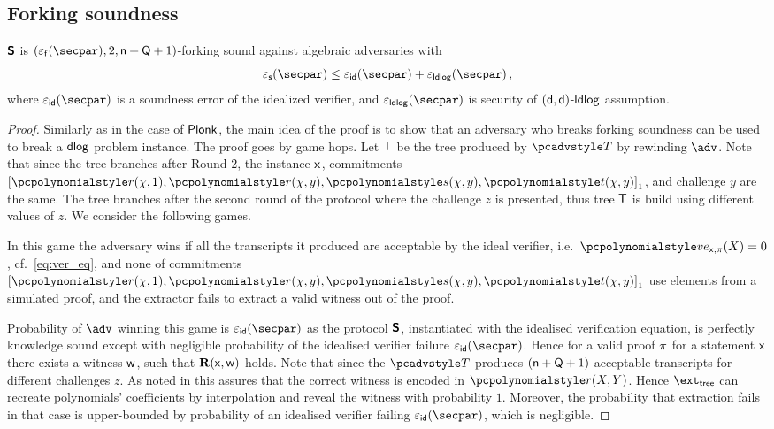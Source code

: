 \documentclass[runningheads,11pt]{llncs}
\begin{document}
\subsection{Forking soundness}
\begin{lemma}
	\label{lem:sonicprot_ss}
  $\bm{\mathsf{S}}$ is $(\epsss(\secpar), 2, \multconstr + \linconstr + 1)$-forking sound against
  algebraic adversaries with
  \[
			\epss(\secpar) \leq \epsid(\secpar) + \epsldlog(\secpar) \,,
	\]
	where $\epsid(\secpar)$ is a soundness error of the idealized verifier, and
  $\epsldlog(\secpar)$ is security of $(\mathsf{d}, \mathsf{d})$-$\mathsf{ldlog}$ assumption.
\end{lemma}
\begin{proof}
  Similarly as in the case of $\textnormal{\textsf{Plonk}}$, the main idea of the proof is to show
  that an adversary who breaks forking soundness can be used to break a $\mathsf{dlog}$ problem
  instance. The proof goes by game hops. Let $\mathsf{T}$ be the tree produced by
  $\tdv$ by rewinding $\adv$. Note that since the tree branches after Round 2,
  the instance $\mathsf{x}$, commitments
  $\gone{\p{r} (\chi, 1), \p{r} (\chi, y), \p{s} (\chi, y), \p{t} (\chi, y)}$, and challenge
  $y$ are the same. The tree branches after the second round
  of the protocol where the challenge $z$ is presented, thus tree $\mathsf{T}$ is
  build using different values of $z$.
%
  We consider the following games.

   In this game the adversary wins if all the transcripts it
  produced are acceptable by the ideal verifier,
  i.e.~$\vereq_{\inp, \zkproof}(X) = 0$, cf.~\cref{eq:ver_eq}, and none of
  commitments
  $\gone{\p{r} (\chi, 1), \p{r} (\chi, y), \p{s} (\chi, y), \p{t} (\chi, y)}$ use
    elements from a simulated proof, and the extractor fails to extract a valid
    witness out of the proof.

     Probability of
    $\adv$ winning this game is $\epsid(\secpar)$ as the protocol $\bm{\mathsf{S}}$,
    instantiated with the idealised verification equation, is perfectly
    knowledge sound except with negligible probability of the idealised verifier
    failure $\epsid(\secpar)$. Hence for a valid proof $\pi$ for a
    statement $\mathsf{x}$ there exists a witness $\mathsf{w}$, such that $\mathbf{R}(\mathsf{x}, \mathsf{w})$
    holds. Note that since the $\tdv$ produces $(\mathsf{n} + \mathsf{Q} + 1)$
    acceptable transcripts for different challenges $z$. As noted in
    \cite{CCS:MBKM19} this assures that the correct witness is encoded in
    $\p{r} (X, Y)$. Hence $\extt$ can recreate polynomials' coefficients by
    interpolation and reveal the witness with probability $1$. Moreover, the
    probability that extraction fails in that case is upper-bounded by
    probability of an idealised verifier failing $\epsid(\secpar)$, which is
    negligible.


\end{proof}
\end{document}

